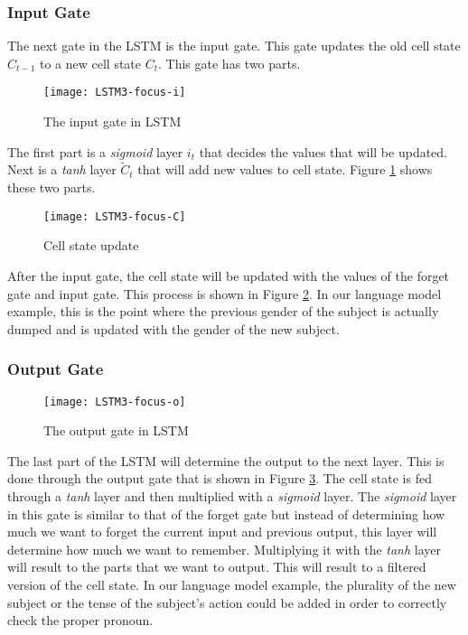     \subsubsection{Input Gate}
        The next gate in the LSTM is the input gate. This gate updates the old cell state \( C_{t-1} \) to a new cell state \( C_t \). This gate has two parts.

        \begin{figure}[H]
        \centering
        \texttt{[image: LSTM3-focus-i]}
        \caption{The input gate in LSTM \cite{olah2015understanding}}
        \label{fig:lstm-input-gate}
        \end{figure}

        The first part is a \textit{sigmoid} layer \( i_t \) that decides the values that will be updated. Next is a \textit{tanh} layer \(\tilde{C}_t\) that will add new values to cell state. Figure \ref{fig:lstm-input-gate} shows these two parts.

        \begin{figure}[H]
        \centering
        \texttt{[image: LSTM3-focus-C]}
        \caption{Cell state update \cite{olah2015understanding}}
        \label{fig:lstm-cell-state-update}
        \end{figure}
        After the input gate, the cell state will be updated with the values of the forget gate and input gate. This process is shown in Figure \ref{fig:lstm-cell-state-update}. In our language model example, this is the point where the previous gender of the subject is actually dumped and is updated with the gender of the new subject.

    \subsubsection{Output Gate}
        \begin{figure}[H]
        \centering
        \texttt{[image: LSTM3-focus-o]}
        \caption{The output gate in LSTM \cite{olah2015understanding}}
        \label{fig:lstm-output-gate}
        \end{figure}
        The last part of the LSTM will determine the output to the next layer. This is done through the output gate that is shown in Figure \ref{fig:lstm-output-gate}. The cell state is fed through a \textit{tanh} layer and then multiplied with a \textit{sigmoid} layer. The \textit{sigmoid} layer in this gate is similar to that of the forget gate but instead of determining how much we want to forget the current input and previous output, this layer will determine how much we want to remember. Multiplying it with the \textit{tanh} layer will result to the parts that we want to output. This will result to a filtered version of the cell state. In our language model example, the plurality of the new subject or the tense of the subject's action could be added in order to correctly check the proper pronoun.

